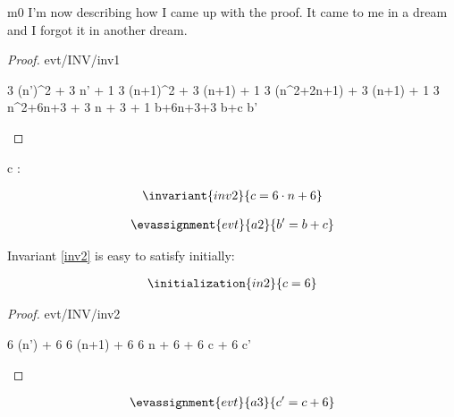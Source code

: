 \documentclass[12pt]{amsart}
\begin{document}
\begin{machine}{m0}
I'm now describing how I came up with the proof. It came to me in a dream and I forgot it in another dream.
%
\begin{proof}{evt/INV/inv1}
	\begin{calculation}
		3 \cdot (n')^2 + 3 \cdot n' + 1
	\hint{=}{ \ref{a0} }
		3 \cdot (n+1)^2 + 3 \cdot (n+1) + 1
		3 \cdot (n^2+2\cdot n+1) + 3 \cdot (n+1) + 1
		3 \cdot n^2+6\cdot n+3 + 3 \cdot n + 3 + 1
	\hint{=}{ \ref{inv1} }
		b+6\cdot n+3+3
		b+c
		b'
	\end{calculation}
\end{proof}

\begin{variable}
	c : \Int
\end{variable}

\begin{align*}
\invariant{inv2}
{	c = 6 \cdot n + 6	}
\end{align*} 

\begin{align*}
\evassignment{evt}{a2}
{	b' = b + c	}
\end{align*}

Invariant \ref{inv2} is easy to satisfy initially:

\begin{align*}
\initialization{in2}
{	c = 6	}
\end{align*}

\begin{proof}{evt/INV/inv2}
	\begin{calculation}
		6 \cdot (n') + 6
	\hint{=}{ \ref{a0} }
		6 \cdot (n+1) + 6
	\hint{=}{ arithmetic }
		6 \cdot n + 6 + 6
	\hint{=}{ \ref{inv2} }
		c + 6
	\hint{=}{ \ref{a3} }
		c'
	\end{calculation}
\end{proof}
%
\begin{align*}
\evassignment{evt}{a3}
{	c' = c + 6	}
\end{align*}

\end{machine}
\end{document}
